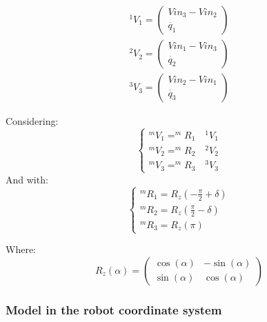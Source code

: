 \begin{gather}
    ^1V_1 =
    \begin{pmatrix} 
        Vin_3-Vin_2 \\
        \dot{q_{1}}
    \end{pmatrix}
    \\
    ^2V_2 =
    \begin{pmatrix} 
        Vin_1-Vin_3 \\
        \dot{q_{2}}
    \end{pmatrix}
    \\
    ^3V_3 =
    \begin{pmatrix} 
        Vin_2-Vin_1 \\
        \dot{q_{3}}
    \end{pmatrix}
\end{gather}





Considering:
\begin{equation*}
    \left\{
        \begin{array}{ll}
            ^mV_1 = ^mR_1 \quad ^1V_1 \\
            ^mV_2 = ^mR_2 \quad ^2V_2 \\
            ^mV_3 = ^mR_3 \quad ^3V_3
        \end{array}
    \right.
\end{equation*}
And with:
\begin{equation*}
    \left\{
        \begin{array}{ll}
            ^mR_1 = R_{z}(-\frac{\pi}{2}+\delta) \\
            ^mR_2 = R_{z}(\frac{\pi}{2}-\delta) \\
            ^mR_3 = R_{z}(\pi)
        \end{array}
    \right.
\end{equation*}



Where: 
\begin{equation*}
    R_{z}(\alpha) = \begin{pmatrix}
                \cos(\alpha) & -\sin(\alpha)\\
                \sin(\alpha) & \cos(\alpha)
            \end{pmatrix}
\end{equation*}
    
\subsubsection{Model in the robot coordinate system}

